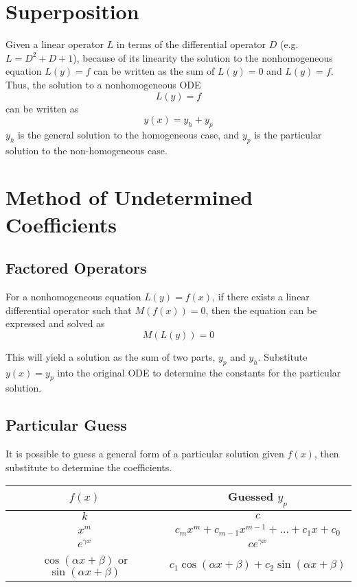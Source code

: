 \documentclass[11pt]{article}
\begin{document}
\section{Superposition}
	Given a linear operator $L$ in terms of the differential operator $D$ (e.g. $L=D^2 + D + 1$), because of its linearity the solution to the nonhomogeneous equation $L(y) = f$ can be written as the sum of $L(y) = 0$ and $L(y) = f$. Thus, the solution to a nonhomogeneous ODE
	\begin{equation}
		L(y) = f
	\end{equation}
	can be written as
	\begin{equation}
		y(x) = y_h + y_p
	\end{equation}
	$y_h$ is the general solution to the homogeneous case, and $y_p$ is the particular solution to the non-homogeneous case.
	
\section{Method of Undetermined Coefficients}
	\subsection{Factored Operators}
		For a nonhomogeneous equation $L(y) = f(x)$, if there exists a linear differential operator such that $M(f(x)) = 0$, then the equation can be expressed and solved as
		\begin{equation}
			M(L(y)) = 0
		\end{equation}
		
		This will yield a solution as the sum of two parts, $y_p$ and $y_h$. Substitute $y(x)=y_p$ into the original ODE to determine the constants for the particular solution.
		
	\subsection{Particular Guess}
		It is possible to guess a general form of a particular solution given $f(x)$, then substitute to determine the coefficients.
		\begin{center}
		\begin{tabular}{c|c}
		$f(x)$ & Guessed $y_p$\\\hline
		$k$ & $c$\\
		$x^m$ & $c_mx^m + c_{m-1}x^{m-1} + \ldots + c_1x + c_0$\\
		$e^{\gamma x}$ & $ce^{\gamma x}$\\
		$\cos(\alpha x + \beta)$ or $\sin(\alpha x + \beta)$ & $c_1 \cos(\alpha x + \beta) + c_2\sin(\alpha x + \beta)$
		\end{tabular}
		\end{center}
		
\end{document}
